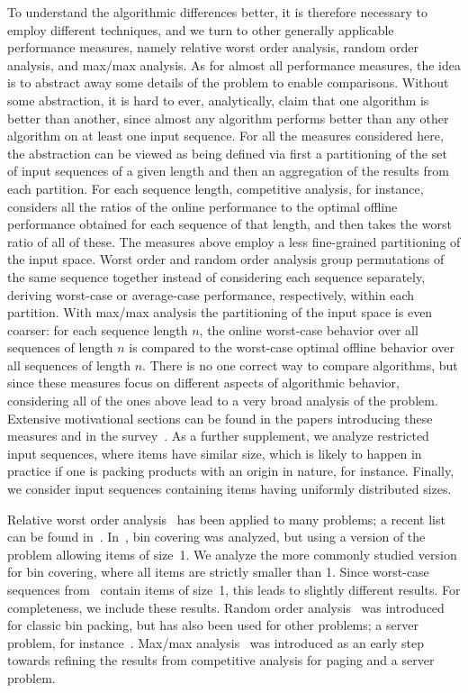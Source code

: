 \documentclass[11pt]{article}
\begin{document}
To understand the algorithmic differences better,
it is therefore necessary to employ different techniques,
and we turn to other generally applicable performance measures, namely
relative worst order analysis, random order analysis, and
max/max analysis.
As for almost all performance measures, the idea is to abstract away
some details of the problem to enable comparisons. Without some abstraction,
it is hard to ever, analytically, claim that one algorithm
is better than another, since almost any algorithm performs better
than any other algorithm on at least one input sequence.
For all the measures considered here, the abstraction can be viewed
as being defined via first a partitioning of the set of input sequences of a given length and then
an aggregation of the results from each partition.
For each sequence length, competitive analysis, for instance,
considers all the ratios of the online performance to the optimal
offline performance obtained for each sequence of that length,
and then takes the worst ratio of all of these.
The measures above employ a less fine-grained partitioning of the
input space.
Worst order and random order analysis group permutations of the same
sequence together instead of considering each sequence separately,
deriving worst-case or average-case performance, respectively, within each partition.
With max/max analysis the partitioning of the input space is even
coarser: for each sequence length $n$, the online worst-case behavior
over all sequences of length $n$ is compared to the worst-case optimal
offline behavior over all sequences of length $n$.
There is no one correct way to compare algorithms,
but since these measures focus on different aspects of algorithmic behavior,
considering all of the ones above lead to a very broad analysis of the problem.
Extensive motivational sections can be found in the papers introducing
these measures and in the survey~\cite{DL05}.
As a further supplement, we analyze restricted input sequences, where
items have similar size, which is likely to happen in practice if one
is packing products with an origin in nature, for instance.
Finally, we consider input sequences containing items having uniformly distributed sizes.

Relative worst order analysis~\cite{BF07j,BFL07j} has been applied to
many problems; a recent list can be found
in~\cite{EKL13j}.
In~\cite{EFK12}, bin covering was analyzed, but using
a version of the problem allowing items of size~1.
We analyze the more commonly studied version for bin covering,
where all items are
strictly smaller than 1. Since worst-case sequences from~\cite{EFK12}
contain items of size~1, this leads to slightly different results.
For completeness, we include these results.
Random order analysis~\cite{K96}
was introduced for classic bin packing, but has also been used
for other problems; a server problem, for instance~\cite{BIL09p}.
Max/max analysis~\cite{BB94} was introduced
as an early step towards refining the results from competitive
analysis for paging and a server problem.
\end{document}
